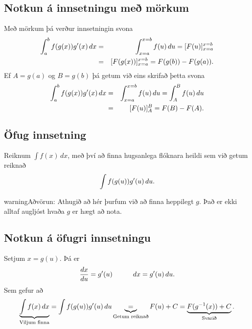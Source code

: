 \documentclass[a4paper,10pt,icelandic]{sphinxmanual}
\begin{document}
\subsection{Notkun á innsetningu með mörkum}
\label{kafli06:notkun-a-innsetningu-me-morkum}
Með mörkum þá verður innsetningin svona
\begin{gather}
\begin{split}\begin{aligned}
  \int_a^b f(g(x))g'(x)\, dx  &=&
  \int_{x=a}^{x=b} f(u)\, du  =
  [F(u)]_{x=a}^{x=b}    \\ &=&
  [F(g(x))]_{x=a}^{x=b}     =
  F(g(b)) - F(g(a)).\end{aligned}\end{split}\notag
\end{gather}
Ef \(A=g(a)\) og \(B=g(b)\) þá getum við eins skrifað þetta
svona
\begin{gather}
\begin{split}\begin{aligned}
\int_a^b f(g(x))g'(x)\, dx  &=&
\int_{x=a}^{x=b} f(u)\, du  =
\int_{A}^{B} f(u)\, du    \\ &=&
[F(u)]_A^B      =
F(B) - F(A).\end{aligned}\end{split}\notag
\end{gather}

\subsection{Öfug innsetning}
\label{kafli06:index-10}\label{kafli06:ofug-innsetning}
Reiknum \(\int f(x)\, dx\), með því að finna hugsanlega flóknara
heildi sem við getum reiknað
\begin{gather}
\begin{split}\int f(g(u))g'(u)\, du.\end{split}\notag
\end{gather}
\begin{notice}{warning}{Aðvörun:}
Athugið að hér þurfum við að finna heppilegt \(g\). Það
er ekki alltaf augljóst hvaða \(g\) er hægt að nota.
\end{notice}


\subsection{Notkun á öfugri innsetningu}
\label{kafli06:notkun-a-ofugri-innsetningu}
Setjum \(x=g(u)\). Þá er
\begin{gather}
\begin{split}\frac{dx}{du}=g'(u)\qquad\quad dx=g'(u)\,du.\end{split}\notag
\end{gather}
Sem gefur að
\begin{gather}
\begin{split}\underbrace{\int f(x)\,dx}_{\text{Viljum finna}}  =
\int f(g(u))g'(u)\,du \underbrace{=}_{\text{Getum reiknað}} F(u) + C
= \underbrace{F(g^{-1}(x)) + C}_{\text{Svarið}}.\end{split}\notag
\end{gather}
\end{document}
